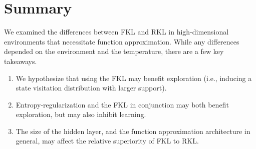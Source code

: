 \documentclass[\main/thesis.tex]{subfiles}
\begin{document}
\section{Summary}
We examined the differences between FKL and RKL in high-dimensional environments that necessitate function approximation. While any differences depended on the environment and the temperature, there are a few key takeaways. 
\begin{enumerate}
    \item We hypothesize that using the FKL may benefit exploration (i.e., inducing a state visitation distribution with larger support).
    \item Entropy-regularization and the FKL in conjunction may both benefit exploration, but may also inhibit learning. 
    \item The size of the hidden layer, and the function approximation architecture in general, may affect the relative superiority of FKL to RKL. 
\end{enumerate}
\end{document}
